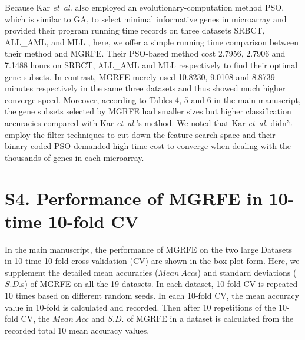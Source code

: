 \documentclass[10pt,journal,compsoc]{IEEEtran}
\begin{document}
	Because Kar \emph{et~al.} also employed an evolutionary-computation method PSO, which is similar to GA, to select minimal informative genes in microarray and provided their program running time records on three datasets SRBCT, ALL\_AML, and MLL \cite{W15}, here, we offer a simple running time comparison between their method and MGRFE. Their PSO-based method cost 2.7956, 2.7906 and 7.1488 hours on SRBCT, ALL\_AML and MLL respectively to find their optimal gene subsets. In contrast, MGRFE merely used 10.8230, 9.0108 and 8.8739 minutes respectively in the same three datasets and thus showed much higher converge speed. Moreover, according to Tables 4, 5 and 6 in the main manuscript, the gene subsets selected by MGRFE had smaller sizes but higher classification accuracies compared with Kar \emph{et~al.}'s method. We noted that Kar \emph{et~al.} didn't employ the filter techniques to cut down the feature search space and their binary-coded PSO demanded high time cost to converge when dealing with the thousands of genes in each microarray.


	\section*{S4. Performance of MGRFE in 10-time 10-fold CV}

	In the main manuscript, the performance of MGRFE on the two large Datasets in 10-time 10-fold cross validation (CV) are shown in the box-plot form. Here, we supplement the detailed mean accuracies ($Mean~Acc$s) and standard deviations ($S.D.$s) of MGRFE on all the 19 datasets. In each dataset, 10-fold CV is repeated 10 times based on different random seeds. In each 10-fold CV, the mean accuracy value in 10-fold is calculated and recorded. Then after 10 repetitions of the 10-fold CV, the $Mean~Acc$ and $S.D.$ of MGRFE in a dataset is calculated from the recorded total 10 mean accuracy values.
	
\end{document}
